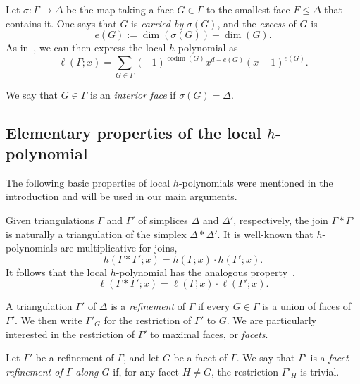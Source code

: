 \documentclass[ALCO,ThmDefs,Unicode,epreuves]{cedram}
\DeclareMathOperator{\codim}{codim}
\begin{document}
Let $\sigma: \Gamma \rightarrow \Delta$ be the map taking a face $G \in \Gamma$ to the smallest face $F \leq \Delta$ that contains it. One says that $G$ is \emph{carried by} $\sigma(G)$, and the \emph{excess} of $G$ is
\[
e(G) := \dim (\sigma(G)) - \dim (G).
\]
As in~\cite[Prop. 2.2]{Stanley92}, we can then express the local $h$-polynomial as
\begin{equation}\label{eq:excess formula}
\ell(\Gamma; x) = \sum_{G \in \Gamma} (-1)^{\codim(G)} x^{d- e(G)} (x-1)^{e(G)}.
\end{equation}

\begin{defi}
We say that $G \in \Gamma$ is an \emph{interior face} if $\sigma(G) = \Delta$. 
\end{defi}


\subsection{Elementary properties of the local \texorpdfstring{$h$}{h}-polynomial}

The following basic properties of local $h$-polynomials were mentioned in the introduction and will be used in our main arguments.

Given triangulations $\Gamma$ and $\Gamma'$ of simplices $\Delta$ and $\Delta'$, respectively, the join $\Gamma * \Gamma'$ is naturally a triangulation of the simplex $\Delta * \Delta'$. It is well-known that $h$-polynomials are multiplicative for joins, \ie
\[
h(\Gamma*\Gamma';x) = h(\Gamma;x)\cdot h(\Gamma';x).
\]
It follows that the local $h$-polynomial has the analogous property~\cite[Lemma~2.2]{AthanasiadisSavvidou12}, \ie
\begin{equation} \label{eq:join}
\ell(\Gamma*\Gamma';x) = \ell(\Gamma;x) \cdot \ell(\Gamma';x).
\end{equation}

A triangulation $\Gamma'$ of $\Delta$ is a \emph{refinement} of $\Gamma$ if every $G \in \Gamma$ is a union of faces of $\Gamma'$. We then write $\Gamma'_G$ for the restriction of $\Gamma'$ to $G$. We are particularly interested in the restriction of $\Gamma'$ to maximal faces, or \emph{facets}.

\begin{defi}
Let $\Gamma'$ be a refinement of $\Gamma$, and let $G$ be a facet of $\Gamma$. We say that $\Gamma'$ is a \emph{facet refinement of $\Gamma$ along $G$} if, for any facet $H \neq G$, the restriction $\Gamma'_H$ is trivial.
\end{defi}
\end{document}
